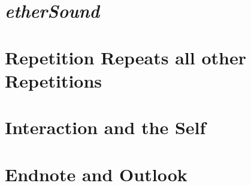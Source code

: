 \documentclass[a4paper]{book}
\numberwithin{equation}{section}
\begin{document}
\chapter[\emph{etherSound}]{\emph{etherSound}}
\label{sec:ethersound}




\chapter[Repetition]{Repetition Repeats all other Repetitions}
\label{cha:repe-main}


\chapter[Interaction]{Interaction and the Self}
\label{sec:interraction-self}


%


\chapter{Endnote and Outlook}
\label{cha:endnote-outlook}



\nocite{oed89,ebonline09,oswald95}
\printbibliography[%
    notcategory=nobib
]
\label{sec:biblio}

\printindex
\label{sec:index}
\end{document}
